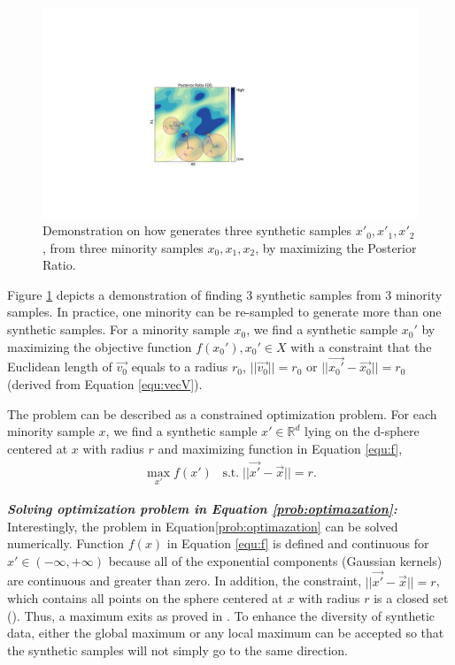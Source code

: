 \begin{figure}[th]
	\includegraphics[width=\linewidth, trim=240 120 390 160,clip]{Figures/MaxPosteriorRatio/sphere_maxF.pdf}
	\caption{Demonstration on how \Methodname{} generates three synthetic samples $x'_0, x'_1, x'_2$, from three minority samples $x_0, x_1, x_2$, by maximizing the Posterior Ratio. }
	\label{fig:sphere_maxF}
\end{figure}

Figure \ref{fig:sphere_maxF} depicts a demonstration of finding 3 synthetic samples from 3 minority samples. In practice, one minority can be re-sampled to generate more than one synthetic samples. For a minority sample $x_0$, we find a synthetic sample $x_0'$ by maximizing the objective function $f(x_0'), x_0' \in X$ with a constraint that the Euclidean length of $\vec{v_0}$ equals to a radius $r_0$, $||\vec{v_0}|| = r_0$ or $||\vec{x_0'}-\vec{x_0}||=r_0$ (derived from Equation \ref{equ:vecV}). 


The problem can be described as a constrained optimization problem. For each minority sample $x$, we find a synthetic sample $x'\in \mathbb{R}^d$ lying on the d-sphere centered at $x$ with radius $r$ and maximizing function in Equation \ref{equ:f},
\begin{align}
	\label{prob:optimazation}
	\max_{x'} {f(x')} \;\;\; \textrm{s.t.}\; ||\vec{x'} - \vec{x}||=r.
\end{align}

\textbf{\textit{Solving optimization problem in Equation \ref{prob:optimazation}:}} Interestingly, the problem in Equation\ref{prob:optimazation} can be solved numerically. Function $f(x)$ in Equation \ref{equ:f} is defined and continuous for $x' \in (-\infty, +\infty)$ because all of the exponential components (Gaussian kernels) are continuous and greater than zero. In addition, the constraint, $||\vec{x'} - \vec{x}||=r$, which contains all points on the sphere centered at $x$ with radius $r$ is a closed set (\cite{wikipedia_2021}). Thus, a maximum exits as proved in \cite{maximum_exist}. To enhance the diversity of synthetic data, either the global maximum or any local maximum can be accepted so that the synthetic samples will not simply go to the same direction.  

